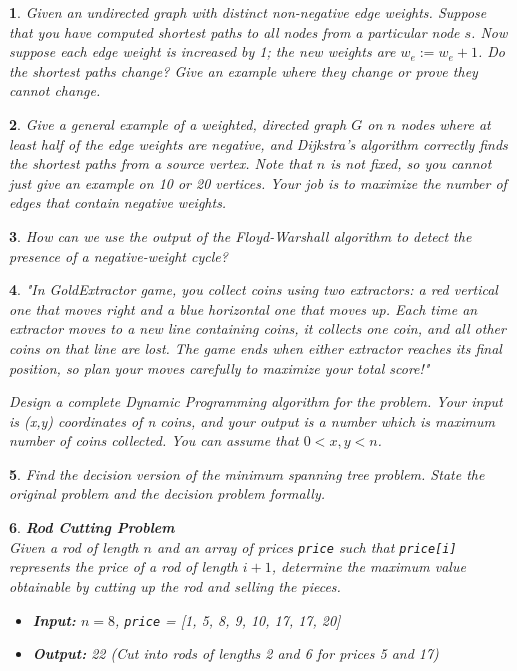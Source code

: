 \documentclass[%
addpoints]{exam}
\theoremstyle{problem}
\newtheorem{p}{}
\begin{document}
\begin{p}
Given an undirected graph with distinct non-negative edge weights. Suppose that you have computed shortest paths to all nodes from a particular node \( s \). Now suppose each edge weight is increased by 1; the new weights are \( w_e := w_e + 1 \). Do the shortest paths change? Give an example where they change or prove they cannot change.
\hfill \end{p}

\begin{p} 
Give a general example of a weighted, directed graph \( G \) on \( n \) nodes where at least half of the edge weights are negative, and Dijkstra's algorithm correctly finds the shortest paths from a source vertex. Note that \( n \) is not fixed, so you cannot just give an example on 10 or 20 vertices. Your job is to maximize the number of edges that contain negative weights.
\hfill \end{p}

\begin{p}
How can we use the output of the Floyd-Warshall algorithm to detect the presence of a negative-weight cycle?
\hfill \end{p}

\begin{p}
"In GoldExtractor game, you collect coins using two extractors: a red vertical one that moves right and a blue horizontal one that moves up. Each time an extractor moves to a new line containing coins, it collects one coin, and all other coins on that line are lost. The game ends when either extractor reaches its final position, so plan your moves carefully to maximize your total score!"

Design a complete Dynamic Programming algorithm for the problem. Your input is (x,y) coordinates of n coins, and your output is a number which is maximum number of coins collected. You can assume that $0 < x,y < n$.
\hfill \end{p}

\begin{p}
Find the decision version of the minimum spanning tree problem. State the original problem and the decision problem formally.
\hfill \end{p}

\begin{p} 
\textbf{Rod Cutting Problem}\\
Given a rod of length $n$ and an array of prices \texttt{price} such that \texttt{price[i]} represents the price of a rod of length $i+1$, determine the maximum value obtainable by cutting up the rod and selling the pieces.
\begin{itemize}
  \item \textbf{Input:} $n = 8$, \texttt{price} = [1, 5, 8, 9, 10, 17, 17, 20]
  \item \textbf{Output:} 22 (Cut into rods of lengths 2 and 6 for prices 5 and 17)
\end{itemize}
\hfill \end{p}
\end{document}
